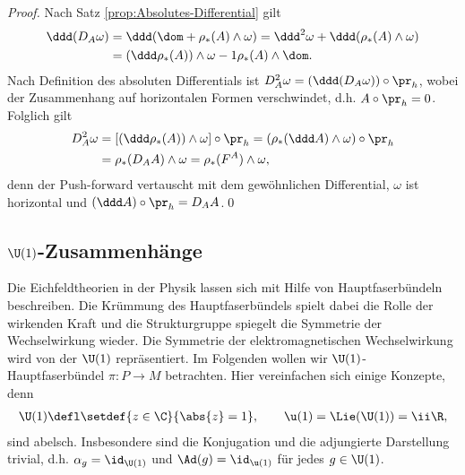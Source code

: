 \documentclass[%
	paper=a5,%
	fleqn,%
	DIV=18,%
	BCOR=0mm,
	fontsize=11pt,
	titlepage=false,%
	bibliography=totoc,
	DIV=18,%
	twoside=true,
	pdftitle=Riemannsche Geometrie,
	pdfauthor=Uwe Semmelmann,
	numbers=noendperiod]%
	{scrbook}
\begin{document}
\begin{proof}
Nach Satz \ref{prop:Absolutes-Differential} gilt
\begin{align*}
\ddd (D_A \omega) &=
\ddd(\dom + \rho_*(A)\wedge \omega)
= \ddd^2\omega + \ddd(\rho_*(A)\wedge \omega)\\
&= (\ddd\rho_*(A))\wedge \omega -1 \rho_*(A)\wedge \dom. 
\end{align*}
Nach Definition des absoluten Differentials ist $D_A^2 \omega = (\ddd(
D_A\omega))\circ\pr_h$, wobei der Zusammenhang  auf horizontalen
Formen verschwindet, d.h. $A\circ\pr_h = 0$. Folglich gilt
\begin{align*}
D_A^2\omega &= [(\ddd\rho_*(A))\wedge \omega]\circ\pr_h
= (\rho_*(\ddd A)\wedge \omega)\circ\pr_h\\
&= \rho_*(D_A A)\wedge \omega
= \rho_*(F^A)\wedge \omega,
\end{align*}
denn der Push-forward vertauscht mit dem gewöhnlichen Differential, $\omega$ ist
horizontal und $(\ddd A)\circ\pr_h = D_A A$.\qed
\end{proof}




\subsection{$\U(1)$-Zusammenhänge}

Die Eichfeldtheorien in der Physik lassen sich mit Hilfe von Hauptfaserbündeln
beschreiben. Die Krümmung des Hauptfaserbündels spielt dabei die Rolle der
wirkenden Kraft und die Strukturgruppe spiegelt die Symmetrie der Wechselwirkung
wieder. Die Symmetrie der elektromagnetischen Wechselwirkung wird von der
$\U(1)$ repräsentiert. Im Folgenden wollen wir $\U(1)$-Hauptfaserbündel
$\pi\colon P\to M$ betrachten. Hier vereinfachen sich einige Konzepte, denn
\begin{align*}
\U(1) \defl \setdef{z\in\C}{\abs{z}=1},\qquad \u(1) = \Lie(\U(1))= 
\ii\R,
\end{align*}
sind abelsch. Insbesondere sind die Konjugation und die adjungierte Darstellung trivial,
d.h. $\alpha_g = \id_{\U(1)}$ und $\Ad(g) = \id_{\u(1)}$ für jedes $g\in \U(1)$.
\end{document}
